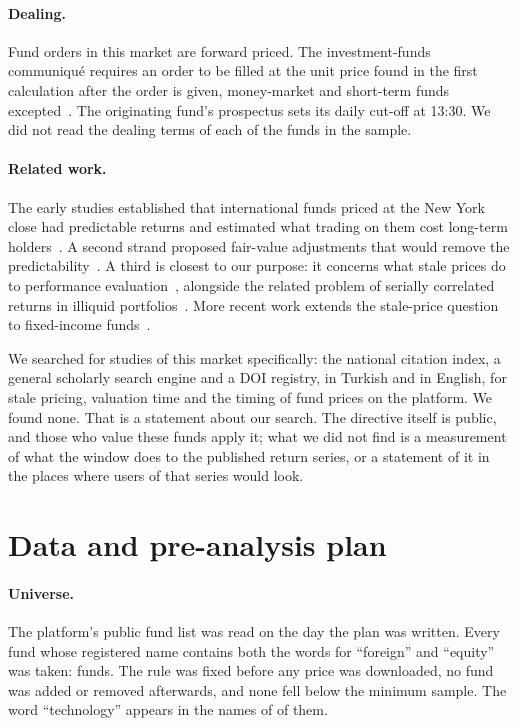 \documentclass[11pt,a4paper]{article}
\begin{document}
\paragraph{Dealing.} Fund orders in this market are forward priced. The
investment-funds communiqu\'e requires an order to be filled at the unit price
found in the first calculation after the order is given, money-market and
short-term funds excepted~\cite{spk2013funds}. The originating fund's
prospectus sets its daily cut-off at 13:30. We did not read the dealing terms
of each of the \NFunds{} funds in the sample.

\paragraph{Related work.} The early studies established that international
funds priced at the New York close had predictable returns and estimated what
trading on them cost long-term
holders~\cite{bhargava1998exploiting,chalmers2001perils,goetzmann2001daytrading,boudoukh2002stale,zitzewitz2003cares,greene2002dilution}.
A second strand proposed fair-value adjustments that would remove the
predictability~\cite{bhargava2001fairvalue,chua2008fairpricing}. A third is
closest to our purpose: it concerns what stale prices do to performance
evaluation~\cite{qian2011stale}, alongside the related problem of serially
correlated returns in illiquid portfolios~\cite{getmansky2004serial}. More recent work extends the stale-price
question to fixed-income funds~\cite{choi2022sitting}.

We searched for studies of this market specifically: the national citation
index, a general scholarly search engine and a DOI registry, in Turkish and in
English, for stale pricing, valuation time and the timing of fund prices on
the platform. We found none. That is a statement about our search. The
directive itself is public, and those who value these funds apply it; what we
did not find is a measurement of what the window does to the
published return series, or a statement of it in the places where users of
that series would look.

\section{Data and pre-analysis plan}\label{sec:data}

\paragraph{Universe.} The platform's public fund list was read on the day the
plan was written. Every fund whose registered name contains both the words for
``foreign'' and ``equity'' was taken: \NFunds{} funds. The rule was fixed
before any price was downloaded, no fund was added or removed afterwards, and
none fell below the minimum sample. The word ``technology'' appears in the
names of \NTech{} of them.
\end{document}
